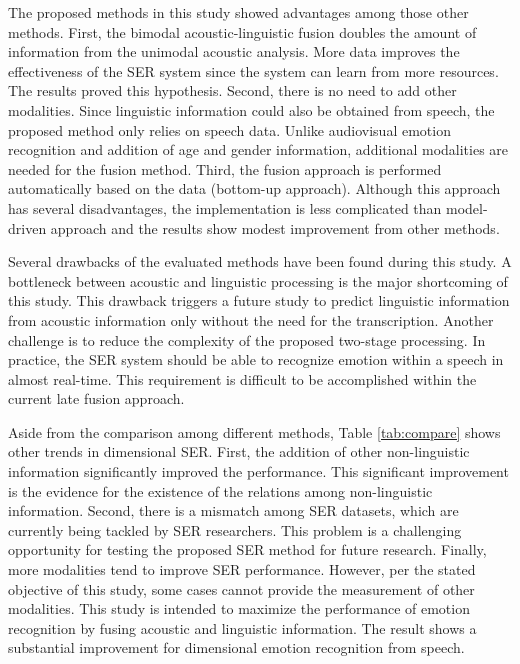 The proposed methods in this study showed advantages among those other methods.
First, the bimodal acoustic-linguistic fusion doubles the amount of information
from the unimodal acoustic analysis. More data improves the effectiveness of
the SER system since the system can learn from more resources. The results
proved this hypothesis. Second, there is no need to add other modalities. Since
linguistic information could also be obtained from speech, the proposed method
only relies on speech data. Unlike audiovisual emotion recognition and addition
of age and gender information, additional modalities are needed for the fusion
method. Third, the fusion approach is performed automatically based on the data
(bottom-up approach). Although this approach has several disadvantages, the
implementation is less complicated than model-driven approach and the results
show modest improvement from other methods. 

Several drawbacks of the evaluated methods have been found during this study. A
bottleneck between acoustic and linguistic processing is the major shortcoming
of this study. This drawback triggers a future study to predict linguistic
information from acoustic information only without the need for the
transcription.  Another challenge is to reduce the complexity of the proposed
two-stage processing. In practice, the SER system should be able to recognize
emotion within a speech in almost real-time. This requirement is difficult to
be accomplished within the current late fusion approach.

Aside from the comparison among different methods, Table \ref{tab:compare}
shows other trends in dimensional SER. First, the addition of other
non-linguistic information significantly improved the performance. This
significant improvement is the evidence for the existence of the relations
among non-linguistic information. Second, there is a mismatch among SER
datasets, which are currently being tackled by SER researchers. This problem is
a challenging opportunity for testing the proposed SER method for future
research. Finally, more modalities tend to improve SER performance. However,
per the stated objective of this study, some cases cannot provide the
measurement of other modalities. This study is intended to maximize the
performance of emotion recognition by fusing acoustic and linguistic
information. The result shows a substantial improvement for dimensional emotion
recognition from speech.


